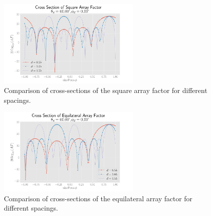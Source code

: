 \begin{figure}[h]
    \centering
    \includegraphics[width=0.618\textwidth]{graphics/task_1/square-60.00-theta-0.00-phi-cross.pdf}
    \caption{Comparison of cross-sections of the square array factor for different spacings.}\label{fig:square-cross}
\end{figure}


\begin{figure}[h]
    \centering
    \includegraphics[width=0.618\textwidth]{graphics/task_3/equilat-60.00-theta-0.00-phi-cross.pdf}
    \caption{Comparison of cross-sections of the equilateral array factor for different spacings.}\label{fig:equilat-cross}
\end{figure}
